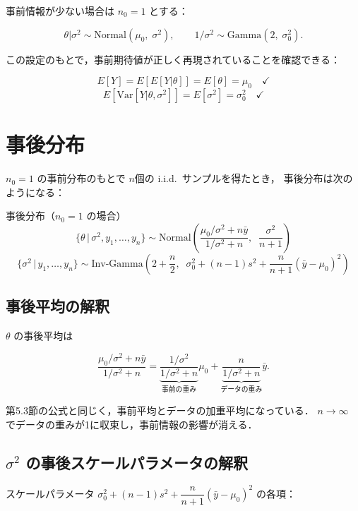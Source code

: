 \documentclass[lualatex,ja=standard,a4paper,12pt]{bxjsarticle}
\begin{document}
事前情報が少ない場合は $n_0 = 1$ とする：

\[
  \theta|\sigma^2 \sim \mathrm{Normal}(\mu_0,\; \sigma^2),
  \qquad
  1/\sigma^2 \sim \mathrm{Gamma}\!\left(2,\; \sigma_0^2\right).
\]

この設定のもとで，事前期待値が正しく再現されていることを確認できる：

\[
  E[Y] = E[E[Y|\theta]] = E[\theta] = \mu_0 \quad \checkmark
\]
\[
  E[\mathrm{Var}[Y|\theta,\sigma^2]] = E[\sigma^2] = \sigma_0^2 \quad \checkmark
\]

\section{事後分布}

$n_0 = 1$ の事前分布のもとで $n$個の i.i.d.\ サンプルを得たとき，
事後分布は次のようになる：

\begin{thmbox}{事後分布（$n_0=1$ の場合）}
\[
  \{\theta\,|\,\sigma^2, y_1,\ldots,y_n\}
  \sim \mathrm{Normal}\!\left(
    \frac{\mu_0/\sigma^2 + n\bar{y}}{1/\sigma^2 + n},\;\;
    \frac{\sigma^2}{n+1}
  \right)
\]
\[
  \{\sigma^2\,|\,y_1,\ldots,y_n\}
  \sim \mathrm{Inv\text{-}Gamma}\!\left(
    2 + \frac{n}{2},\;\;
    \sigma_0^2 + (n-1)s^2 + \frac{n}{n+1}(\bar{y}-\mu_0)^2
  \right)
\]
\end{thmbox}

\subsection*{事後平均の解釈}

$\theta$ の事後平均は

\[
  \frac{\mu_0/\sigma^2 + n\bar{y}}{1/\sigma^2 + n}
  = \underbrace{\frac{1/\sigma^2}{1/\sigma^2 + n}}_{\text{事前の重み}}\mu_0
  + \underbrace{\frac{n}{1/\sigma^2 + n}}_{\text{データの重み}}\bar{y}.
\]

第5.3節の公式と同じく，事前平均とデータの加重平均になっている．
$n \to \infty$ でデータの重みが1に収束し，事前情報の影響が消える．

\subsection*{$\sigma^2$ の事後スケールパラメータの解釈}

スケールパラメータ $\sigma_0^2 + (n-1)s^2 + \dfrac{n}{n+1}(\bar{y}-\mu_0)^2$ の各項：
\end{document}
